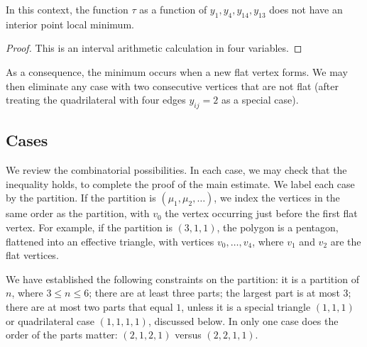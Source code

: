 \begin{lemma}
In this context, the function $\tau$ as a function of $y_1,y_4,y_{14},y_{13}$ does not have an interior point local minimum.
\end{lemma}

\begin{proof} This is an interval arithmetic calculation in four variables.
\end{proof}

As a consequence, the minimum occurs when a new flat vertex forms.  We may then eliminate any case with two consecutive vertices that are not flat (after treating the quadrilateral with four edges $y_{ij}=2$ as a special case).

\subsection{Cases}

We review the combinatorial possibilities.  In each case, we may check that the inequality holds, to complete the proof of the main estimate.  We label each 
case by the partition.  If the partition is $(\mu_1,\mu_2,\ldots)$, we
index the vertices in the same order as the partition, with $v_0$
the vertex occurring just before the first flat vertex.  For example,
if the partition is $(3,1,1)$, the polygon is a pentagon, flattened into
an effective triangle, with vertices $v_0,\ldots,v_4$, where $v_1$ and $v_2$
are the flat vertices.

We have established the following constraints on the partition: it is
a partition of $n$, where $3\le n\le 6$; there
are at least three parts; the largest part is at most $3$;  there are
at most two parts that equal $1$, unless it is a special triangle $(1,1,1)$ or
quadrilateral case $(1,1,1,1)$, discussed below.  In only one case
does the order of the parts matter: $(2,1,2,1)$ versus $(2,2,1,1)$.

